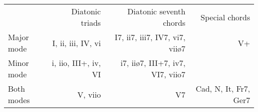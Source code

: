 \begin{tabular}{lrrr}
            & Diatonic triads      & Diatonic seventh chords          & Special chords        \\
Major mode & I, ii, iii, IV, vi   & I7, ii7, iii7, IV7, vi7, viiø7   & V+                    \\
Minor mode & i, iio, III+, iv, VI & i7, iiø7, III+7, iv7, VI7, viio7 &                       \\
Both modes & V, viio              & V7                               & Cad, N, It, Fr7, Ger7
\end{tabular}
